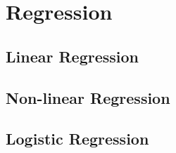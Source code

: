 
\chapter{Regression}
\label{chapter4}

\section{Linear Regression}
\label{section4.1}

\section{Non-linear Regression}
\label{section4.2}

\section{Logistic Regression}
\label{section4.3}